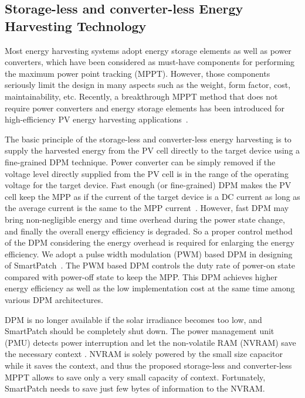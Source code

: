 \documentclass[journal]{IEEEtran}
\begin{document}
\subsection{Storage-less and converter-less Energy Harvesting Technology}
Most energy harvesting systems adopt energy storage elements as well as power converters, which have been considered as must-have components for performing the maximum power point tracking (MPPT). However, those components seriously limit the design in many aspects such as the weight, form factor, cost, maintainability, etc. Recently, a breakthrough MPPT method that does not require power converters and energy storage elements has been introduced for high-efficiency PV energy harvesting applications~\cite{Wang:ASPDAC14}.

The basic principle of the storage-less and converter-less energy harvesting is to supply the harvested energy from the PV cell directly to the target device using a fine-grained DPM technique. %
Power converter can be simply removed if the voltage level directly supplied from the PV cell is in the range of the operating voltage for the target device. 
Fast enough (or fine-grained) DPM makes the PV cell keep the MPP as if the current of the target device is a DC current as long as the average current is the same to the MPP current~\cite{Wang:ASPDAC14}. However, fast DPM may bring non-negligible energy and time overhead during the power state change, and finally the overall energy efficiency is degraded. So a proper control method of the DPM considering the energy overhead is required for enlarging the energy efficiency. We adopt a pulse width modulation (PWM) based DPM in designing of SmartPatch~\cite{Lee:ASPDAC15}. The PWM based DPM controls the duty rate of power-on state compared with power-off state to keep the MPP. This DPM achieves higher energy efficiency as well as the low implementation cost at the same time among various DPM architectures.

DPM is no longer available if the solar irradiance becomes too low, and SmartPatch should be completely shut down. The power management unit (PMU) detects power interruption and let the non-volatile RAM (NVRAM) save the necessary context \cite{Balsamo:TCAD16}. NVRAM is solely powered by the small size capacitor while it saves the context, and thus the proposed storage-less and converter-less MPPT allows to save only a very small capacity of context. Fortunately, SmartPatch needs to save just few bytes of information to the NVRAM.
\end{document}
